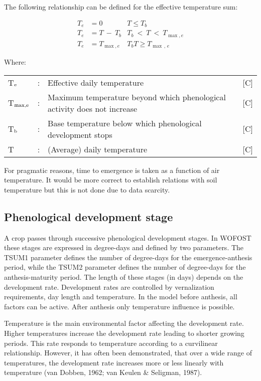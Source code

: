 The following relationship can be defined for the effective temperature sum:

\begin{align}
T_{e} &= 0            & T \le T _{b} \nonumber  \\
T_{e} &= T~-~ T _{b}  & T _{b} ~<~T ~ < ~T _{\max ,e} \nonumber  \\
T_{e} &= T _{\max ,e} & T _{b} T \ge  T _{\max \, ,\, e}
\end{align}

Where:\\[5pt]
\begin{tabularx}{\textwidth}{llXr}
	T$_{{\rm e}}$ &:& Effective daily temperature & 
	[\textdegree C]\\
	T$_{{\rm max,e}}$ &:& Maximum temperature beyond which phenological 
	activity does not increase    &    [\textdegree C]\\
	T$_{{\rm b}}$ &:& Base temperature below which phenological development stops & 
	[\textdegree C]\\
	T  &:& (Average) daily temperature & [\textdegree C]
\end{tabularx}

For pragmatic reasons, time to emergence is taken as a function of air temperature. It would be more correct to establish 
relations with soil temperature but this is not done due to data scarcity.


\subsection{Phenological development stage}
\label{sec:DVS}

A crop passes through successive phenological development stages. In WOFOST these stages 
are expressed in degree-days and defined by two parameters. The TSUM1 parameter defines
the number of degree-days for the emergence-anthesis period, while the TSUM2 parameter
defines the number of degree-days for the anthesis-maturity period. 
The length of these stages (in days) depends on the development rate. Development rates are 
controlled by vernalization requirements, day length and temperature. In the model before
anthesis, all factors can be active. After anthesis only temperature influence is possible.

Temperature is the main environmental factor affecting the development rate. Higher
temperatures increase the development rate leading to shorter growing periods. This rate
responds to temperature according to a curvilinear relationship. However, it has often
been demonstrated, that over a wide range of temperatures, the development rate
increases more or less linearly with temperature (van Dobben, 1962; van Keulen \&
Seligman, 1987).

